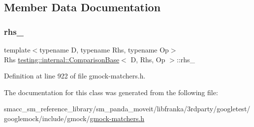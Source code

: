 \subsection{Member Data Documentation}
\mbox{\label{classtesting_1_1internal_1_1ComparisonBase_ad5d76d60c4599bbdf3da2b2c07e6169d}} 
\subsubsection{\texorpdfstring{rhs\+\_\+}{rhs\_}}
{\footnotesize\ttfamily template$<$typename D, typename Rhs, typename Op$>$ \\
Rhs \hyperlink{classtesting_1_1internal_1_1ComparisonBase}{testing\+::internal\+::\+Comparison\+Base}$<$ D, Rhs, Op $>$\+::rhs\+\_\+\hspace{0.3cm}{\ttfamily [private]}}



Definition at line 922 of file gmock-\/matchers.\+h.



The documentation for this class was generated from the following file\+:\begin{DoxyCompactItemize}
\item 
smacc\+\_\+sm\+\_\+reference\+\_\+library/sm\+\_\+panda\+\_\+moveit/libfranka/3rdparty/googletest/googlemock/include/gmock/\hyperlink{gmock-matchers_8h}{gmock-\/matchers.\+h}\end{DoxyCompactItemize}
